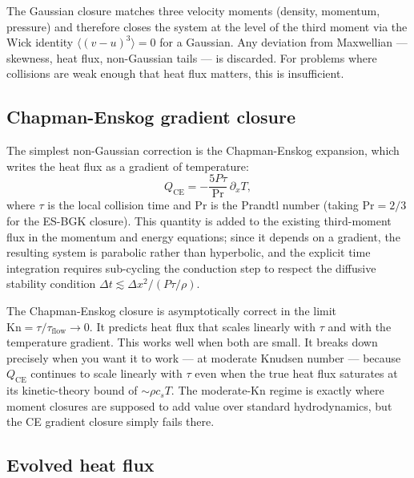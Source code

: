 \documentclass[11pt,letterpaper]{article}
\newcommand{\Kn}{\mathrm{Kn}}
\begin{document}
The Gaussian closure matches three velocity moments (density, momentum, pressure) and therefore closes the system at the level of the third moment via the Wick identity $\langle (v-u)^3 \rangle = 0$ for a Gaussian. Any deviation from Maxwellian --- skewness, heat flux, non-Gaussian tails --- is discarded. For problems where collisions are weak enough that heat flux matters, this is insufficient.

\subsection{Chapman-Enskog gradient closure}

The simplest non-Gaussian correction is the Chapman-Enskog expansion, which writes the heat flux as a gradient of temperature:
\begin{equation}
Q_{\mathrm{CE}} = -\frac{5 P \tau}{\mathrm{Pr}}\,\partial_x T,
\label{eq:qce}
\end{equation}
where $\tau$ is the local collision time and $\mathrm{Pr}$ is the Prandtl number (taking $\mathrm{Pr} = 2/3$ for the ES-BGK closure). This quantity is added to the existing third-moment flux in the momentum and energy equations; since it depends on a gradient, the resulting system is parabolic rather than hyperbolic, and the explicit time integration requires sub-cycling the conduction step to respect the diffusive stability condition $\Delta t \lesssim \Delta x^2 / (P \tau / \rho)$.

The Chapman-Enskog closure is asymptotically correct in the limit $\Kn = \tau/\tau_{\mathrm{flow}} \to 0$. It predicts heat flux that scales linearly with $\tau$ and with the temperature gradient. This works well when both are small. It breaks down precisely when you want it to work --- at moderate Knudsen number --- because $Q_{\mathrm{CE}}$ continues to scale linearly with $\tau$ even when the true heat flux saturates at its kinetic-theory bound of $\sim \rho c_s T$. The moderate-Kn regime is exactly where moment closures are supposed to add value over standard hydrodynamics, but the CE gradient closure simply fails there.

\subsection{Evolved heat flux}
\end{document}
